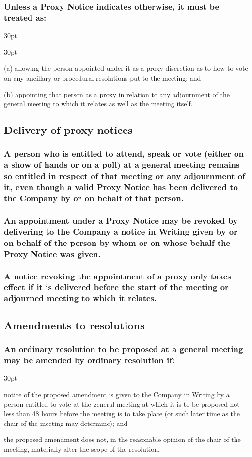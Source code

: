 \documentclass[12pt]{article}
\def\clauseindent{30pt}
\newenvironment{subindentpara}{\begin{adjustwidth}{\clauseindent}{}\begin{hanginglist}}{\end{hanginglist}\end{adjustwidth}}
\newenvironment{subindentlist}{\begin{adjustwidth}{\clauseindent}{}\begin{labeledlist}{\clauseindent}}{\end{labeledlist}\end{adjustwidth}}
\begin{document}
\subsubsection{Unless a Proxy Notice indicates otherwise, it must be treated as:}
\begin{subindentlist}
    \item [(a)] allowing the person appointed under it as a proxy discretion as to how to vote on any ancillary or procedural resolutions put to the meeting; and
    \item [(b)] appointing that person as a proxy in relation to any adjournment of the general meeting to which it relates as well as the meeting itself.
\end{subindentlist}

\subsection{Delivery of proxy notices}
\subsubsection{A person who is entitled to attend, speak or vote (either on a show of hands or on a poll) at a general meeting remains so entitled in respect of that meeting or any adjournment of it, even though a valid Proxy Notice has been delivered to the Company by or on behalf of that person.}
\subsubsection{An appointment under a Proxy Notice may be revoked by delivering to the Company a notice in Writing given by or on behalf of the person by whom or on whose behalf the Proxy Notice was given.}
\subsubsection{A notice revoking the appointment of a proxy only takes effect if it is delivered before the start of the meeting or adjourned meeting to which it relates.}

\subsection{Amendments to resolutions}
\subsubsection{An ordinary resolution to be proposed at a general meeting may be amended by ordinary resolution if:}
\begin{subindentpara}
    \item notice of the proposed amendment is given to the Company in Writing by a person entitled to vote at the general meeting at which it is to be proposed not less than 48 hours before the meeting is to take place (or such later time as the chair of the meeting may determine); and
    \item the proposed amendment does not, in the reasonable opinion of the chair of the meeting, materially alter the scope of the resolution.
\end{subindentpara}
\end{document}
